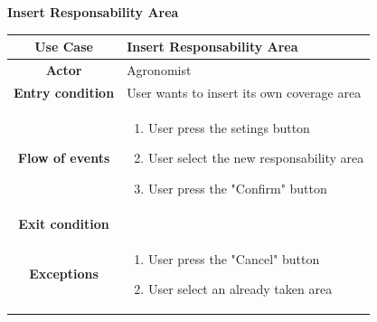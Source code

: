 \documentclass[table, 12pt]{article}
\begin{document}
\begin{itemize}
            \begin{table}[H]
                \item[] \textbf{Insert Responsability Area}
                \item[] 
                \centering
                \begin{tabular}{|c |m{}|}
                    \hline
                    \textbf{Use Case} & Insert Responsability Area\\ \hline
                    \textbf{Actor} & Agronomist\\ \hline
                    \textbf{Entry condition} & User wants to insert its own coverage area\\  \hline
                    \textbf{Flow of events} & \begin{enumerate}
                                                \item User press the setings button
                                                \item User select the new responsability area
                                                \item User press the "Confirm" button 
                                            \end{enumerate}\\ \hline
                    \textbf{Exit condition} & \\ \hline
                    \textbf{Exceptions} &  \begin{enumerate}
                        \item User press the "Cancel" button
                        \item User select an already taken area
                    \end{enumerate}\\ \hline                    
                \end{tabular}
            \end{table}


\end{itemize}
\end{document}
